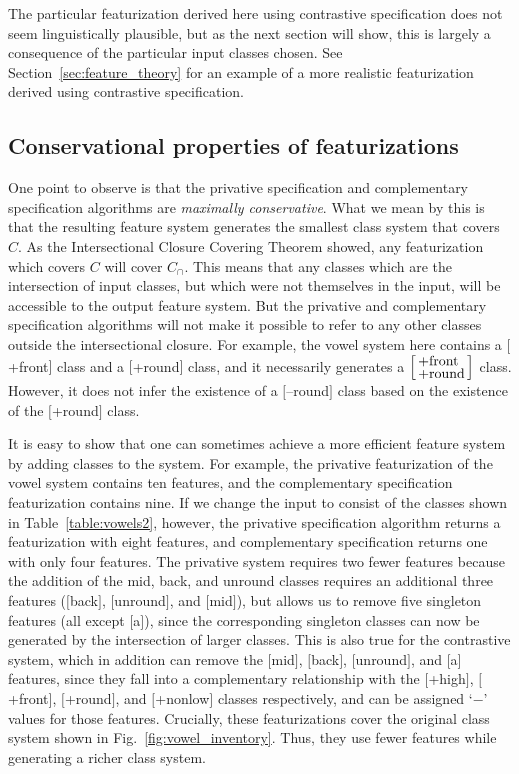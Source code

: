 \documentclass[12pt, oneside]{article}   	%
\newcommand{\featmat}[1]
{$[$#1$]$}
\newcommand{\featmattwo}[2]{$\begin{bsmallmatrix*}[l]\text{\normalsize #1}\\\text{\normalsize #2}\end{bsmallmatrix*}$}
\begin{document}
The particular featurization derived here using contrastive specification does not seem linguistically plausible, but as the next section will show, this is largely a consequence of the particular input classes chosen. See Section~\ref{sec:feature_theory} for an example of a more realistic featurization derived using contrastive specification.

\subsection{Conservational properties of featurizations}

One point to observe is that the privative specification and complementary specification algorithms are \textit{maximally conservative}. What we mean by this is that the resulting feature system generates the smallest class system that covers $C$. As the Intersectional Closure Covering Theorem showed, any featurization which covers $C$ will cover $C_\cap$. This means that any classes which are the intersection of input classes, but which were not themselves in the input, will be accessible to the output feature system. But the privative and complementary specification algorithms will not make it possible to refer to any other classes outside the intersectional closure. For example, the vowel system here contains a \featmat{+front} class and a \featmat{+round} class, and it necessarily generates a \featmattwo{+front}{+round} class. However, it does not infer the existence of a \featmat{--round} class based on the existence of the \featmat{+round} class.

It is easy to show that one can sometimes achieve a more efficient feature system by adding classes to the system. For example, the privative featurization of the vowel system contains ten features, and the complementary specification featurization contains nine. If we change the input to consist of the classes shown in Table~\ref{table:vowels2}, however, the privative specification algorithm returns a featurization with eight features, and complementary specification returns one with only four features. The privative system requires two fewer features because the addition of the mid, back, and unround classes requires an additional three features (\featmat{back}, \featmat{unround}, and \featmat{mid}), but allows us to remove five singleton features (all except \featmat{a}), since the corresponding singleton classes can now be generated by the intersection of larger classes. This is also true for the contrastive system, which in addition can remove the \featmat{mid}, \featmat{back}, \featmat{unround}, and \featmat{a} features, since they fall into a complementary relationship with the \featmat{+high}, \featmat{+front}, \featmat{+round}, and \featmat{+nonlow} classes respectively, and can be assigned `$-$' values for those features. Crucially, these featurizations cover the original class system shown in Fig.~\ref{fig:vowel_inventory}. Thus, they use fewer features while generating a richer class system.
\end{document}

